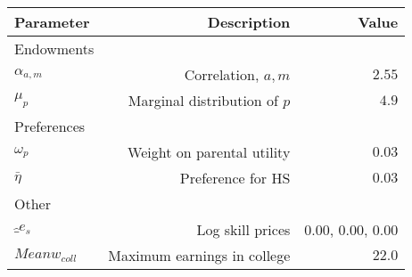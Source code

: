 \begin{tabular}{lrr}
\hline
Parameter & Description  & Value  \\
\hline
Endowments &   &   \\
$\alpha_{a,m}$ & Correlation, $a,m$  & $2.55$  \\
$\mu_{p}$ & Marginal distribution of $p$  & $4.9$  \\
Preferences &   &   \\
$\omega_{p}$ & Weight on parental utility  & $0.03$  \\
$\bar{\eta}$ & Preference for HS  & $0.03$  \\
Other &   &   \\
$\hat_{e}_{s}$ & Log skill prices  & 0.00, 0.00, 0.00  \\
$Mean w_{coll}$ & Maximum earnings in college  & $22.0$  \\
\hline
\end{tabular}%
